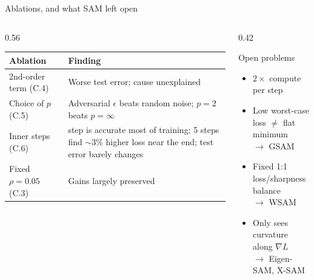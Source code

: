 \documentclass[aspectratio=169,10pt]{beamer}
\newcommand{\mt}[1]{\textcolor{muted}{#1}}
\begin{document}
\begin{frame}{Ablations, and what SAM left open}
\begin{columns}[T]
\begin{column}{0.56\textwidth}
\small
\renewcommand{\arraystretch}{1.2}
\begin{tabular}{@{}>{\raggedright}p{2.4cm}>{\raggedright\arraybackslash}p{4.9cm}@{}}
\toprule
Ablation & Finding\\
\midrule
2nd-order term (C.4) & Worse test error; cause unexplained\\
Choice of $p$ (C.5) & Adversarial $\epsilon$ beats random noise; $p=2$ beats $p=\infty$\\
Inner steps (C.6) & 1 step is accurate most of training; 5 steps find $\sim$3\% higher loss near the end; test error barely changes\\
Fixed $\rho=0.05$ (C.3) & Gains largely preserved\\
\bottomrule
\end{tabular}
\end{column}
\begin{column}{0.42\textwidth}
\begin{alertblock}{Open problems}
\begin{itemize}
  \item $2\times$ compute per step
  \item Low worst-case loss $\neq$ flat minimum\\ \mt{$\to$ GSAM}
  \item Fixed 1:1 loss/sharpness balance\\ \mt{$\to$ WSAM}
  \item Only sees curvature along $\nabla L$\\ \mt{$\to$ Eigen-SAM, X-SAM}
\end{itemize}
\end{alertblock}
\end{column}
\end{columns}
\end{frame}
\end{document}
